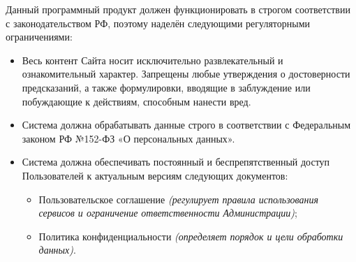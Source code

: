 
Данный программный продукт должен функционировать в строгом соответствии с законодательством РФ, поэтому наделён следующими регуляторными ограничениями:
\begin{itemize}
  \item Весь контент Сайта носит исключительно развлекательный и ознакомительный характер. Запрещены любые утверждения о достоверности предсказаний, а также формулировки, вводящие в заблуждение или побуждающие к действиям, способным нанести вред.
  \item Система должна обрабатывать данные строго в соответствии с Федеральным законом РФ №152-ФЗ «О персональных данных».
  \item Система должна обеспечивать постоянный и беспрепятственный доступ Пользователей к актуальным версиям следующих документов:
  \begin{itemize}
    \item Пользовательское соглашение \textit{(регулирует правила использования сервисов и ограничение ответственности Администрации)};
    \item Политика конфиденциальности \textit{(определяет порядок и цели обработки данных)}.
  \end{itemize}
\end{itemize}